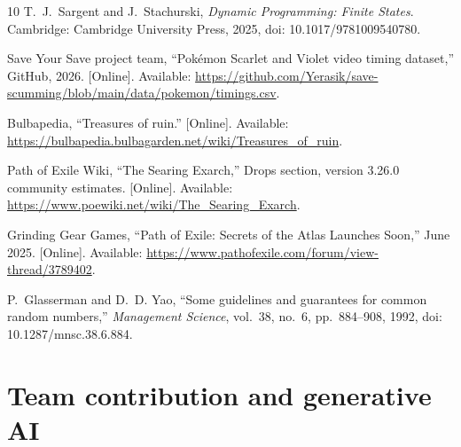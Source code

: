 \documentclass[11pt,a4paper]{article}
\begin{document}
{\begin{thebibliography}{10}
T.~J.~Sargent and J.~Stachurski, \emph{Dynamic Programming: Finite States}. Cambridge: Cambridge University Press, 2025, doi: 10.1017/9781009540780.

Save Your Save project team, ``Pok\'emon Scarlet and Violet video timing dataset,'' GitHub, 2026. [Online]. Available:
\url{https://github.com/Yerasik/save-scumming/blob/main/data/pokemon/timings.csv}.

Bulbapedia, ``Treasures of ruin.'' [Online]. Available:
\url{https://bulbapedia.bulbagarden.net/wiki/Treasures_of_ruin}.

Path of Exile Wiki, ``The Searing Exarch,'' Drops section, version 3.26.0 community estimates. [Online]. Available:
\url{https://www.poewiki.net/wiki/The_Searing_Exarch}.

Grinding Gear Games, ``Path of Exile: Secrets of the Atlas Launches Soon,'' June 2025. [Online]. Available:
\url{https://www.pathofexile.com/forum/view-thread/3789402}.

P.~Glasserman and D.~D. Yao, ``Some guidelines and guarantees for common random numbers,'' \emph{Management Science}, vol.~38, no.~6, pp.~884--908, 1992, doi: 10.1287/mnsc.38.6.884.
\end{thebibliography}
}

\section{Team contribution and generative AI}
\label{sec:contrib}
\end{document}
